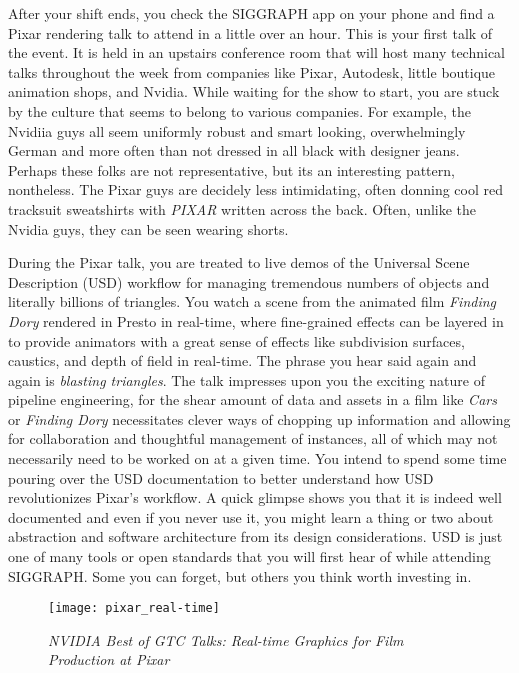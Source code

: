 \documentclass[../main.tex]{subfiles}
\begin{document}
After your shift ends, you check the SIGGRAPH app on your phone and find a Pixar rendering talk to attend in a little over an hour. This is your first talk of the event. It is held in an upstairs conference room that will host many technical talks throughout the week from companies like Pixar, Autodesk, little boutique animation shops, and Nvidia. While waiting for the show to start, you are stuck by the culture that seems to belong to various companies. For example, the Nvidiia guys all seem uniformly robust and smart looking, overwhelmingly German and more often than not dressed in all black with designer jeans. Perhaps these folks are not representative, but its an interesting pattern, nontheless. The Pixar guys are decidely less intimidating, often donning cool red tracksuit sweatshirts with \textit{PIXAR} written across the back. Often, unlike the Nvidia guys, they can be seen wearing shorts.

During the Pixar talk, you are treated to live demos of the Universal Scene Description  (USD) workflow for managing tremendous numbers of objects and literally billions of triangles. You watch a scene from the animated film \textit{Finding Dory} rendered in Presto in real-time, where fine-grained effects can be layered in to provide animators with a great sense of effects like subdivision surfaces, caustics, and depth of field in real-time. The phrase you hear said again and again is \textit{blasting triangles}. The talk impresses upon you the exciting nature of pipeline engineering, for the shear amount of data and assets in a film like \textit{Cars} or \textit{Finding Dory} necessitates clever ways of chopping up information and allowing for collaboration and thoughtful management of instances, all of which may not necessarily need to be worked on at a given time. You intend to spend some time pouring over the USD documentation to better understand how USD revolutionizes Pixar's workflow. A quick glimpse shows you that it is indeed well documented and even if you never use it, you might learn a thing or two about abstraction and software architecture from its design considerations. USD is just one of many tools or open standards that you will first hear of while attending SIGGRAPH. Some you can forget, but others you think worth investing in.


\begin{figure}[h!]
	\centering
	\texttt{[image: pixar\_real-time]}
	\caption*{\textit{NVIDIA Best of GTC Talks: Real-time Graphics for Film Production at Pixar}}
\end{figure}
\end{document}

